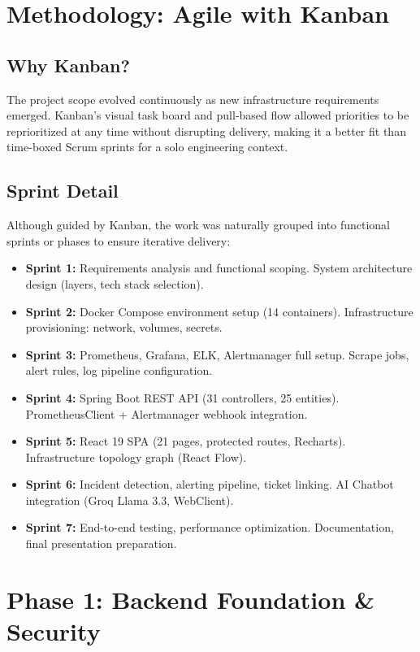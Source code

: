 \documentclass[12pt,a4paper]{report}
\begin{document}
\section{Methodology: Agile with Kanban}

\subsection{Why Kanban?}
The project scope evolved continuously as new infrastructure requirements emerged. Kanban's visual task board and pull-based flow allowed priorities to be reprioritized at any time without disrupting delivery, making it a better fit than time-boxed Scrum sprints for a solo engineering context.

\subsection{Sprint Detail}
Although guided by Kanban, the work was naturally grouped into functional sprints or phases to ensure iterative delivery:
\begin{itemize}
    \item \textbf{Sprint 1:} Requirements analysis and functional scoping. System architecture design (layers, tech stack selection).
    \item \textbf{Sprint 2:} Docker Compose environment setup (14 containers). Infrastructure provisioning: network, volumes, secrets.
    \item \textbf{Sprint 3:} Prometheus, Grafana, ELK, Alertmanager full setup. Scrape jobs, alert rules, log pipeline configuration.
    \item \textbf{Sprint 4:} Spring Boot REST API (31 controllers, 25 entities). PrometheusClient + Alertmanager webhook integration.
    \item \textbf{Sprint 5:} React 19 SPA (21 pages, protected routes, Recharts). Infrastructure topology graph (React Flow).
    \item \textbf{Sprint 6:} Incident detection, alerting pipeline, ticket linking. AI Chatbot integration (Groq Llama 3.3, WebClient).
    \item \textbf{Sprint 7:} End-to-end testing, performance optimization. Documentation, final presentation preparation.
\end{itemize}

\section{Phase 1: Backend Foundation \& Security}
\end{document}
